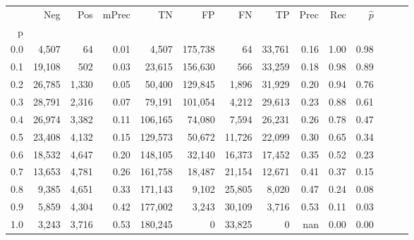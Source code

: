 \begin{tabular}{rrrrrrrrrrrrrr}
\toprule
{} &     Neg &    Pos & mPrec &       TN &       FP &      FN &      TP &  Prec &   Rec & $\hat{p}$ \\
p   &         &        &       &          &          &         &         &       &       &           \\
\midrule
0.0 &   4,507 &     64 &  0.01 &    4,507 &  175,738 &      64 &  33,761 &  0.16 &  1.00 &      0.98 \\
0.1 &  19,108 &    502 &  0.03 &   23,615 &  156,630 &     566 &  33,259 &  0.18 &  0.98 &      0.89 \\
0.2 &  26,785 &  1,330 &  0.05 &   50,400 &  129,845 &   1,896 &  31,929 &  0.20 &  0.94 &      0.76 \\
0.3 &  28,791 &  2,316 &  0.07 &   79,191 &  101,054 &   4,212 &  29,613 &  0.23 &  0.88 &      0.61 \\
0.4 &  26,974 &  3,382 &  0.11 &  106,165 &   74,080 &   7,594 &  26,231 &  0.26 &  0.78 &      0.47 \\
0.5 &  23,408 &  4,132 &  0.15 &  129,573 &   50,672 &  11,726 &  22,099 &  0.30 &  0.65 &      0.34 \\
0.6 &  18,532 &  4,647 &  0.20 &  148,105 &   32,140 &  16,373 &  17,452 &  0.35 &  0.52 &      0.23 \\
0.7 &  13,653 &  4,781 &  0.26 &  161,758 &   18,487 &  21,154 &  12,671 &  0.41 &  0.37 &      0.15 \\
0.8 &   9,385 &  4,651 &  0.33 &  171,143 &    9,102 &  25,805 &   8,020 &  0.47 &  0.24 &      0.08 \\
0.9 &   5,859 &  4,304 &  0.42 &  177,002 &    3,243 &  30,109 &   3,716 &  0.53 &  0.11 &      0.03 \\
1.0 &   3,243 &  3,716 &  0.53 &  180,245 &        0 &  33,825 &       0 &   nan &  0.00 &      0.00 \\
\bottomrule
\end{tabular}
